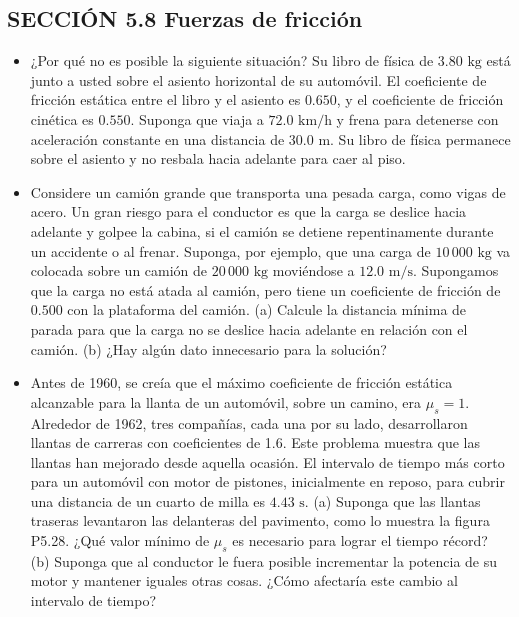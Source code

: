 \documentclass[11pt,a4paper]{article}
\begin{document}
\newpage

\subsection*{SECCIÓN 5.8 Fuerzas de fricción}

\begin{itemize}
    \item[\textbf{26.}] ¿Por qué no es posible la siguiente situación? Su libro de física de $3.80 \text{ kg}$ está junto a usted sobre el asiento horizontal de su automóvil. El coeficiente de fricción estática entre el libro y el asiento es $0.650$, y el coeficiente de fricción cinética es $0.550$. Suponga que viaja a $72.0 \text{ km/h}$ y frena para detenerse con aceleración constante en una distancia de $30.0 \text{ m}$. Su libro de física permanece sobre el asiento y no resbala hacia adelante para caer al piso.
    \vspace*{6cm}

    \item[\textbf{27.}] Considere un camión grande que transporta una pesada carga, como vigas de acero. Un gran riesgo para el conductor es que la carga se deslice hacia adelante y golpee la cabina, si el camión se detiene repentinamente durante un accidente o al frenar. Suponga, por ejemplo, que una carga de $10\,000 \text{ kg}$ va colocada sobre un camión de $20\,000 \text{ kg}$ moviéndose a $12.0 \text{ m/s}$. Supongamos que la carga no está atada al camión, pero tiene un coeficiente de fricción de $0.500$ con la plataforma del camión. (a) Calcule la distancia mínima de parada para que la carga no se deslice hacia adelante en relación con el camión. (b) ¿Hay algún dato innecesario para la solución?
    \vspace*{6cm}

    \item[\textbf{28.}] Antes de 1960, se creía que el máximo coeficiente de fricción estática alcanzable para la llanta de un automóvil, sobre un camino, era $\mu_s = 1$. Alrededor de 1962, tres compañías, cada una por su lado, desarrollaron llantas de carreras con coeficientes de 1.6. Este problema muestra que las llantas han mejorado desde aquella ocasión. El intervalo de tiempo más corto para un automóvil con motor de pistones, inicialmente en reposo, para cubrir una distancia de un cuarto de milla es $4.43 \text{ s}$. (a) Suponga que las llantas traseras levantaron las delanteras del pavimento, como lo muestra la figura P5.28. ¿Qué valor mínimo de $\mu_s$ es necesario para lograr el tiempo récord? (b) Suponga que al conductor le fuera posible incrementar la potencia de su motor y mantener iguales otras cosas. ¿Cómo afectaría este cambio al intervalo de tiempo?
    \vspace*{6cm}


\end{itemize}
\end{document}
